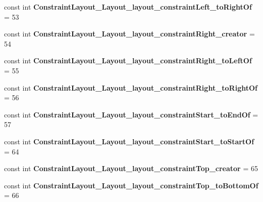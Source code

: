 \begin{DoxyCompactItemize}
const int {\bfseries Constraint\+Layout\+\_\+\+Layout\+\_\+layout\+\_\+constraint\+Left\+\_\+to\+Right\+Of} = 53
\item 
\mbox{\label{classst_delivery_1_1_resource_1_1_styleable_a59ec04b04f5f434350ef5a2ab9aa2b75}} 
const int {\bfseries Constraint\+Layout\+\_\+\+Layout\+\_\+layout\+\_\+constraint\+Right\+\_\+creator} = 54
\item 
\mbox{\label{classst_delivery_1_1_resource_1_1_styleable_af5cce59ee5aff28c4ddfaa9f13242784}} 
const int {\bfseries Constraint\+Layout\+\_\+\+Layout\+\_\+layout\+\_\+constraint\+Right\+\_\+to\+Left\+Of} = 55
\item 
\mbox{\label{classst_delivery_1_1_resource_1_1_styleable_a9e9d5db878430fe5f15bebfc9f99eaa6}} 
const int {\bfseries Constraint\+Layout\+\_\+\+Layout\+\_\+layout\+\_\+constraint\+Right\+\_\+to\+Right\+Of} = 56
\item 
\mbox{\label{classst_delivery_1_1_resource_1_1_styleable_a2d5ddda4de4afdcd9752924a989eeb56}} 
const int {\bfseries Constraint\+Layout\+\_\+\+Layout\+\_\+layout\+\_\+constraint\+Start\+\_\+to\+End\+Of} = 57
\item 
\mbox{\label{classst_delivery_1_1_resource_1_1_styleable_a0cda05f5cb016d606e2fe9482549f07e}} 
const int {\bfseries Constraint\+Layout\+\_\+\+Layout\+\_\+layout\+\_\+constraint\+Start\+\_\+to\+Start\+Of} = 64
\item 
\mbox{\label{classst_delivery_1_1_resource_1_1_styleable_ab4aace7124ab6296b5aa9afa2f1e4d7b}} 
const int {\bfseries Constraint\+Layout\+\_\+\+Layout\+\_\+layout\+\_\+constraint\+Top\+\_\+creator} = 65
\item 
\mbox{\label{classst_delivery_1_1_resource_1_1_styleable_a83ee177acaadc093dd3434765f7930ee}} 
const int {\bfseries Constraint\+Layout\+\_\+\+Layout\+\_\+layout\+\_\+constraint\+Top\+\_\+to\+Bottom\+Of} = 66
\item 
\mbox{\label{classst_delivery_1_1_resource_1_1_styleable_aebda8fd827c5ca835cadad4dc0a2cff9}} 

\end{DoxyCompactItemize}
